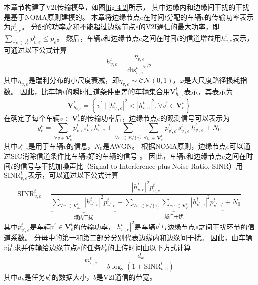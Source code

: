 本章节构建了V2I传输模型，如图\ref{fig 4-2}所示， 其中边缘内和边缘间干扰的干扰是基于NOMA原则建模的。
本章将边缘节点$e$在时间$t$分配的车辆$v$的传输功率表示为$p_{v, e}^{t}$。
分配的功率之和不能超过边缘节点$e$的V2I通信的最大功率，即$\sum_{\forall v \in {V}_{e}^{t}} p_{v, e}^{t} \leq p_{e}$。
然后，车辆$v$和边缘节点$e$之间在时间$t$的信道增益用$h_{v, e}^t$表示，可通过以下公式计算\cite{sun2020performance}
\begin{equation}
	h_{v, e}^t = \frac{\eta_{v, e}}{{\operatorname{dis}_{v, e}^{t}}^{\varphi/2}}
\end{equation}
\noindent 其中$\eta_{v, e}$是瑞利分布的小尺度衰减，即$\eta_{v, e} \sim \mathcal{CN}(0, 1)$，$\varphi$是大尺度路径损耗指数。
因此，比车辆$v$的瞬时信道条件更差的车辆集合用$\mathbf{V}_{h_{v, e}}^{t}$表示，其表示为
\begin{equation}
	\mathbf{V}_{h_{v, e}}^{t} = \left \{ v^{\prime} \mid  \left|h_{v^{\prime}, e}^t \right|^{2} < \left| h_{v, e}^t\right |^{2} , \forall v^{\prime} \in \mathbf{V}_{e}^{t} \right \}
\end{equation}
在确定了每个车辆$v \in \mathbf{V}_{e}^{t}$的传输功率后，边缘节点$e$的观测信号可以表示为\cite{islam2017power}
\begin{equation}
	y_e^{t} = \sum_{\forall v \in \mathbf{V}_{e}^{t}} p_{v, e}^{t} s_{v, e}^{t} h_{v, e}^t + \sum\limits_{\forall e^{\prime} \in \mathbf{E} / \{e\}} \sum\limits_{\forall v^{\prime} \in \mathbf{V}_{e^{\prime}}^{t}} p_{v^{\prime}, e^{\prime}}^{t} s_{v^{\prime}, e^{\prime}}^{t} h_{v^{\prime}, e}^t + N_{0}
\end{equation}
其中$s_{v, e}^{t}$是用于车辆$v$的信息，$N_{0}$是AWGN。
根据NOMA原则，边缘节点$e$可以通过SIC消除信道条件比车辆$v$好的车辆的信号 \cite{du2021ji}。
因此，车辆$v$和边缘节点$e$之间在时间$t$的信号与干扰加噪声比（Signal-to-Interference-plus-Noise Ratio, SINR）用$\mathrm{SINR}_{v, e}^t$表示，可以通过以下公式计算
\begin{equation}
	\mathrm{SINR}_{v, e}^t = \frac{ |h_{v, e}^t| ^{2}  p_{v, e}^{t}}{ \underbrace{\sum\limits_{\forall v^{\prime} \in \mathbf{V}_{h_{v, e}}^{t}} |h_{v^{\prime}, e}^t|^2 p_{v^{\prime}, e}^{t}}_{\text {域内干扰}} + \underbrace{\sum\limits_{\forall e^{\prime} \in \mathbf{E} / \{e\}} \sum\limits_{\forall v^{\prime} \in \mathbf{V}_{e^{\prime}}^{t}} |h_{v^{\prime}, e}^t|^2 p_{v^{\prime}, e^{\prime}}^{t}}_{\text {域间干扰}} + N_{0}}
\end{equation}
其中$p_{v^{\prime}, e}^{t}$是车辆$v^{\prime} \in \mathbf{V}_{e}^{t}$的传输功率，$|h_{v^{\prime}, e}^t|^2$是车辆$v^{\prime}$与边缘节点$e$之间干扰环节的信道系数。
分母中的第一和第二部分分别代表边缘内和边缘间干扰。
因此，由车辆$v$请求并传输给边缘节点$e$的任务$k_{v}^{t}$的上传时间由以下方式计算
\begin{equation}
	m_{v, e}^{t} = \frac{d_{k}}{b  \log _{2}\left(1+\mathrm{SINR}_{v, e}^t\right)}
\end{equation}
其中$d_k$是任务$k_{v}^{t}$的数据大小，$b$是V2I通信的带宽。

